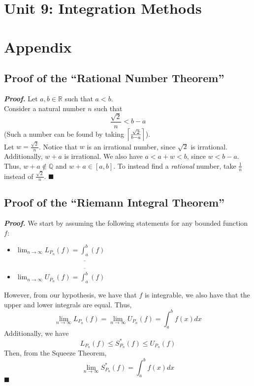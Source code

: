 \documentclass[10pt]{article}
\def\Q{{\mathbb Q}}
\def\R{{\mathbb R}}
\DeclarePairedDelimiter\ceil{\lceil}{\rceil}
\newenvironment{proof}{\par\textit{\textbf{Proof.}}}{\hfill$\blacksquare$}
\begin{document}
\section{Unit 9: Integration Methods}


\section{Appendix}
\subsection{Proof of the ``Rational Number Theorem''}
\begin{proof}
    Let $a,b\in\R$ such that $a<b$. \\
    Consider a natural number $n$ such that
    $$
        \frac{\sqrt 2}{n}<b-a
    $$
    (Such a number can be found by taking $\ceil*{\frac{\sqrt 2}{b-a}}$). \\
    Let $w=\frac{\sqrt{2}}{n}$. Notice that $w$ is an irrational number, since $\sqrt{2}$ is irrational. Additionally, $w+a$ is irrational. We also have $a<a+w<b$, since $w<b-a$. Thus, $w+a\notin\Q$ and $w+a\in[a,b]$. To instead find a \textit{rational} number, take $\frac{1}{n}$ instead of $\frac{\sqrt{2}}{n}$.
\end{proof}
\subsection{Proof of the ``Riemann Integral Theorem''}
\begin{proof}
    We start by assuming the following statements for any bounded function $f$:
    \begin{itemize}
        \item $\displaystyle\lim_{n\to\infty}L_{P_n}(f)=\underline{\int_a^b}(f)$
        \item $\displaystyle\lim_{n\to\infty}U_{P_n}(f)=\overline{\int_a^b}(f)$
    \end{itemize}
    However, from our hypothesis, we have that $f$ is integrable, we also have that the upper and lower integrals are equal. Thus,
    $$
        \lim_{n\to\infty} L_{P_n}(f)=\lim_{n\to\infty} U_{P_n}(f) = \int_a^b f(x)dx
    $$
    Additionally, we have
    $$
        L_{P_n}(f)\leq S_{P_n}^*(f)\leq U_{P_n}(f)
    $$
    Then, from the Squeeze Theorem,
    $$
        \lim_{n\to\infty} S_{P_n}^*(f)=\int_a^bf(x)dx
    $$
\end{proof}
\end{document}
